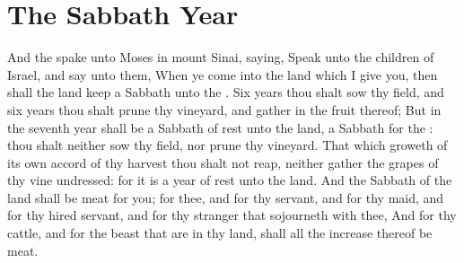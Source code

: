 \section*{The Sabbath Year}
\begin{biblechapter} %
\verse And the \LORD spake unto Moses in mount Sinai, saying,
\verse Speak unto the children of Israel, and say unto them, When ye come into the land which I give you, then shall the land keep a Sabbath unto the \LORD.
\verse Six years thou shalt sow thy field, and six years thou shalt prune thy vineyard, and gather in the fruit thereof;
\verse But in the seventh year shall be a Sabbath of rest unto the land, a Sabbath for the \LORD: thou shalt neither sow thy field, nor prune thy vineyard.
\verse That which groweth of its own accord of thy harvest thou shalt not reap, neither gather the grapes of thy vine undressed: for it is a year of rest unto the land.
\verse And the Sabbath of the land shall be meat for you; for thee, and for thy servant, and for thy maid, and for thy hired servant, and for thy stranger that sojourneth with thee,
\verse And for thy cattle, and for the beast that are in thy land, shall all the increase thereof be meat.

\end{biblechapter}
